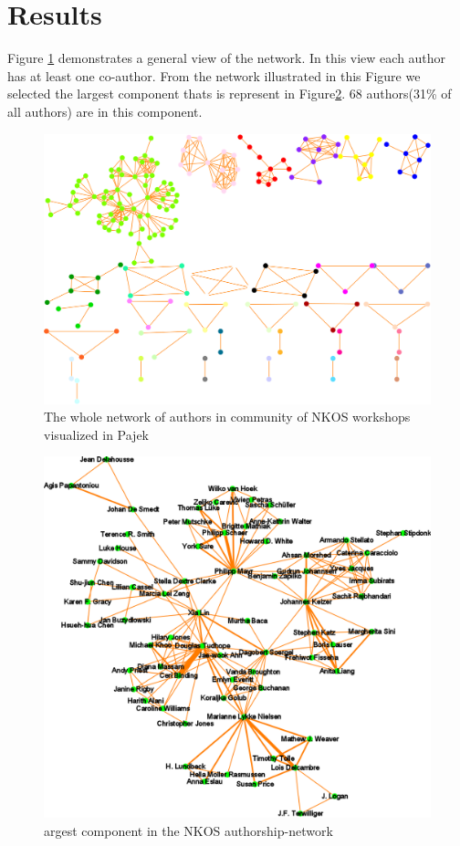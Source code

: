 \documentclass[runningheads,a4paper]{llncs}
\begin{document}
\section{Results}\label{results}
Figure \ref{fig:wholenet} demonstrates a general view of the network. In this view each author has at least one co-author. From the network illustrated in this Figure we selected the largest component thats is represent in Figure\ref{fig:largestComponent}. 68 authors(31\% of all authors) are in this component.
\begin{figure}[H]
	\centering
	\includegraphics[width=1.0\linewidth]{wholeNet}
	\caption{The whole network of authors in community of NKOS workshops visualized in Pajek}
	\label{fig:wholenet}
\end{figure}
\begin{figure}[H]
	\centering
	\includegraphics[width=1\linewidth]{largestComponent}
	\caption{argest component in the NKOS authorship-network}
	\label{fig:largestComponent}
\end{figure}
\end{document}
